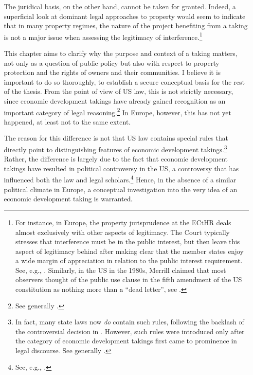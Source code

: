 The juridical basis, on the other hand, cannot be taken for granted. Indeed, a superficial look at dominant legal approaches to property would seem to indicate that in many property regimes, the nature of the project benefiting from a taking is not a major issue when assessing the legitimacy of interference.\footnote{For instance, in Europe, the property jurisprudence at the ECtHR deals almost exclusively with other aspects of legitimacy. The Court typically stresses that interference must be in the public interest, but then leave this aspect of legitimacy behind after making clear that the member states enjoy a wide margin of appreciation in relation to the public interest requirement. See, e.g., \cite{james86,lindheim12}. Similarly, in the US in the 1980s, Merrill claimed that most observers thought of the public use clause in the fifth amendment of the US constitution as nothing more than a ``dead letter'', see \cite[61]{merrill86}.} 

This chapter aims to clarify why the purpose and context of a taking matters, not only as a question of public policy but also with respect to property protection and the rights of owners and their communities. I believe it is important to do so thoroughly, to establish a secure conceptual basis for the rest of the thesis. From the point of view of US law, this is not strictly necessary, since economic development takings have already gained recognition as an important category of legal reasoning.\footnote{See generally \cite{cohen06,somin07,malloy08}.} In Europe, however, this has not yet happened, at least not to the same extent.

The reason for this difference is not that US law contains special rules that directly point to distinguishing features of economic development takings.\footnote{In fact, many state laws now {\it do} contain such rules, following the backlash of the controversial decision in \cite{kelo05}. However, such rules were introduced only after the category of economic development takings first came to prominence in legal discourse. See generally \cite{eagle08,somin09,jacobs11}.} Rather, the difference is largely due to the fact that economic development takings have resulted in political controversy in the US, a controversy that has influenced both the law and legal scholars.\footnote{See, e.g., \cite[1190-1192]{somin08}.} Hence, in the absence of a similar political climate in Europe, a conceptual investigation into the very idea of an economic development taking is warranted.

